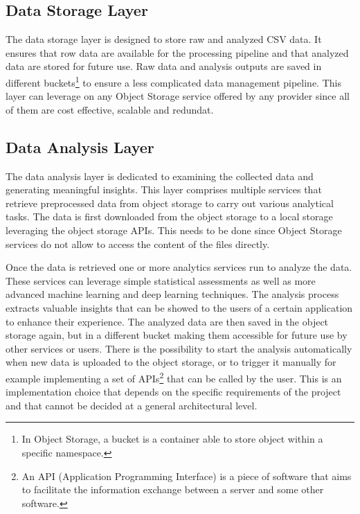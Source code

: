 \subsection{Data Storage Layer}

The data storage layer is designed to store raw and analyzed CSV data. It ensures that row data are available for the processing pipeline and that analyzed data are stored for future use. Raw data and analysis outputs are saved in different buckets\footnote{In Object Storage, a bucket is a container able to store object within a specific namespace.} to ensure a less complicated data management pipeline.
This layer can leverage on any Object Storage service offered by any provider since all of them are cost effective, scalable and redundat. 

\subsection{Data Analysis Layer}

The data analysis layer is dedicated to examining the collected data and generating meaningful insights. This layer comprises multiple services that retrieve preprocessed data from object storage to carry out various analytical tasks. The data is first downloaded from the object storage to a local storage leveraging the object storage APIs. This needs to be done since Object Storage services do not allow to access the content of the files directly.

Once the data is retrieved one or more analytics services run to analyze the data. These services can leverage simple statistical assessments as well as more advanced machine learning and deep learning techniques.
The analysis process extracts valuable insights that can be showed to the users of a certain application to enhance their experience. 
The analyzed data are then saved in the object storage again, but in a different bucket making them accessible for future use by other services or users.
There is the possibility to start the analysis automatically when new data is uploaded to the object storage, or to trigger it manually for example implementing a set of APIs\footnote{An API (Application Programming Interface) is a piece of software that aims to facilitate the information exchange between a server and some other software.} that can be called by the user. This is an implementation choice that depends on the specific requirements of the project and that cannot be decided at a general architectural level.

